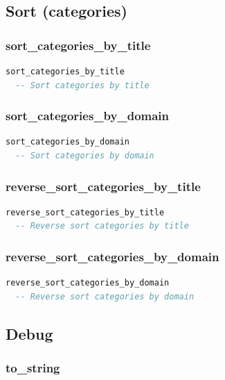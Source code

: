 \subsection{Sort (categories)}
\label{sec:channel-sort-categories}

\subsubsection{sort\_categories\_by\_title}

\begin{lstlisting}[language=Eiffel]
sort_categories_by_title
  -- Sort categories by title
\end{lstlisting}

\subsubsection{sort\_categories\_by\_domain}

\begin{lstlisting}[language=Eiffel]
sort_categories_by_domain
  -- Sort categories by domain
\end{lstlisting}

\subsubsection{reverse\_sort\_categories\_by\_title}

\begin{lstlisting}[language=Eiffel]
reverse_sort_categories_by_title
  -- Reverse sort categories by title
\end{lstlisting}

\subsubsection{reverse\_sort\_categories\_by\_domain}

\begin{lstlisting}[language=Eiffel]
reverse_sort_categories_by_domain
  -- Reverse sort categories by domain
\end{lstlisting}


\subsection{Debug}
\label{sec:channel-debug}

\subsubsection{to\_string}

